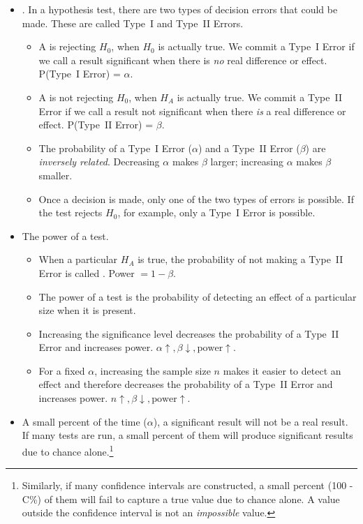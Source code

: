 \begin{itemize}
\item {}.  In a hypothesis test, there are two types of decision errors that could be made.  These are called Type~I and Type~II Errors. \vspace{-1mm}
\begin{itemize}
\item A  is rejecting $H_0$, when $H_0$ is actually true.  We commit a Type~I Error if we call a result significant when there is \emph{no} real difference or effect.  P(Type~I Error) = $\alpha$.
\item A  is not rejecting $H_0$, when $H_A$ is actually true.  We commit a Type~II Error if we call a result not significant when there \emph{is} a real difference or effect.  P(Type~II Error) = $\beta$.
\item The probability of a Type~I Error ($\alpha$) and a Type~II Error ($\beta$) are \emph{inversely related}. Decreasing $\alpha$ makes $\beta$ larger; increasing $\alpha$ makes $\beta$ smaller.  
\item Once a decision is made, only one of the two types of errors is possible.  If the test rejects $H_0$, for example, only a Type~I Error is possible.
\end{itemize}
\item The power of a test.
\begin{itemize}\vspace{-1mm}
\setlength{\itemsep}{0mm}
\item When a particular $H_A$ is true, the probability of not making a Type~II Error is called .  Power $= 1 - \beta$.  
\item The power of a test is the probability of detecting an effect of a particular size when it is present.
\item Increasing the significance level decreases the probability of a Type~II Error and increases power.  $\alpha \uparrow, \beta \downarrow, \text{power} \uparrow$.  
\item For a fixed $\alpha$, increasing the sample size $n$ makes it easier to detect an effect and therefore decreases the probability of a Type~II Error and increases power.   $n \uparrow, \beta \downarrow, \text{power} \uparrow$.


\end{itemize}


\item A small percent of the time ($\alpha$), a significant result will not be a real result.  If many tests are run, a small percent of them will produce significant results due to chance alone.\footnote{Similarly, if many confidence intervals are constructed, a small percent (100 - C\%) of them will fail to capture a true value due to chance alone.  A value outside the confidence interval is not an \emph{impossible} value.}


\end{itemize}
